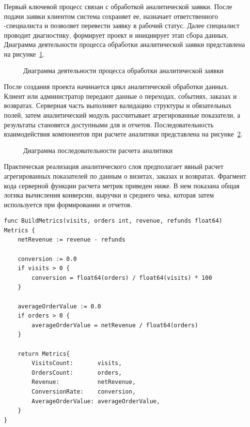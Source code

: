 Первый ключевой процесс связан с обработкой аналитической заявки. После подачи заявки клиентом система сохраняет ее, назначает ответственного -специалиста и позволяет перевести заявку в рабочий статус. Далее специалист проводит диагностику, формирует проект и инициирует этап сбора данных. Диаграмма деятельности процесса обработки аналитической заявки представлена на рисунке~\ref{fig:application-processing-activity}.

\begin{figure}[H]
    \centering
    \caption{Диаграмма деятельности процесса обработки аналитической заявки}
    \label{fig:application-processing-activity}
\end{figure}

После создания проекта начинается цикл аналитической обработки данных. Клиент или администратор передают данные о переходах, событиях, заказах и возвратах. Серверная часть выполняет валидацию структуры и обязательных полей, затем аналитический модуль рассчитывает агрегированные показатели, а результаты становятся доступными для  и отчетов. Последовательность взаимодействия компонентов при расчете аналитики представлена на рисунке~\ref{fig:analytics-calculation-sequence}.

\begin{figure}[H]
    \centering
    \caption{Диаграмма последовательности расчета аналитики}
    \label{fig:analytics-calculation-sequence}
\end{figure}

Практическая реализация аналитического слоя предполагает явный расчет агрегированных показателей по данным о визитах, заказах и возвратах. Фрагмент кода серверной функции расчета метрик приведен ниже. В нем показана общая логика вычисления конверсии, выручки и среднего чека, которая затем используется при формировании  и отчетов.

\begin{center}
\begin{minipage}{0.92\textwidth}
\captionsetup{type=figure}
\label{fig:go-analytics-code}
\begin{Verbatim}[frame=single,fontsize=\fontsize{10pt}{12pt}\selectfont]
func BuildMetrics(visits, orders int, revenue, refunds float64) Metrics {
    netRevenue := revenue - refunds

    conversion := 0.0
    if visits > 0 {
        conversion = float64(orders) / float64(visits) * 100
    }

    averageOrderValue := 0.0
    if orders > 0 {
        averageOrderValue = netRevenue / float64(orders)
    }

    return Metrics{
        VisitsCount:       visits,
        OrdersCount:       orders,
        Revenue:           netRevenue,
        ConversionRate:    conversion,
        AverageOrderValue: averageOrderValue,
    }
}
\end{Verbatim}
\end{minipage}
\end{center}

